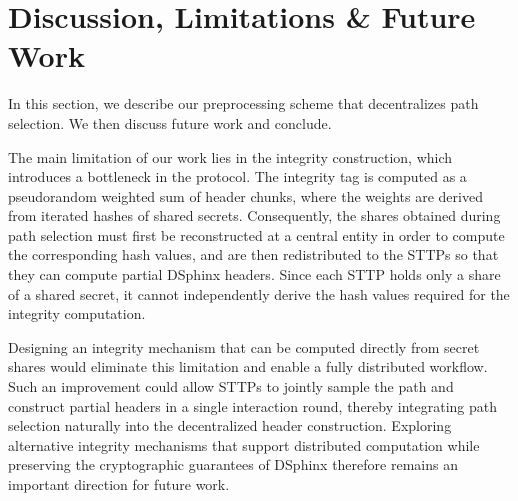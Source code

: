 
\section{Discussion, Limitations \&  Future Work}
\label{sec:discussion}
In this section, we describe our preprocessing scheme that decentralizes path selection. We then discuss future work and conclude.

The main limitation of our work lies in the integrity construction, which introduces a bottleneck in the protocol. The integrity tag \C{} is computed as a pseudorandom weighted sum of header chunks, where the weights are derived from iterated hashes of shared secrets. Consequently, the shares obtained during path selection must first be reconstructed at a central entity in order to compute the corresponding hash values, and are then redistributed to the STTPs so that they can compute partial DSphinx headers. Since each STTP holds only a share of a shared secret, it cannot independently derive the hash values required for the integrity computation. 

Designing an integrity mechanism that can be computed directly from secret shares would eliminate this limitation and enable a fully distributed workflow. Such an improvement could allow STTPs to jointly sample the path and construct partial headers in a single interaction round, thereby integrating path selection naturally into the decentralized header construction. 
Exploring alternative integrity mechanisms that support distributed computation while preserving the cryptographic guarantees of DSphinx therefore remains an important direction for future work.

